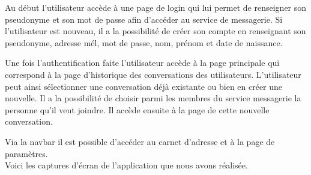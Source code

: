 \par Au début l'utilisateur accède à une page de login qui lui permet de renseigner son pseudonyme et son mot de passe afin d'accéder au service de messagerie. Si l'utilisateur est nouveau, il a la possibilité de créer son compte en renseignant son pseudonyme, adresse mél, mot de passe, nom, prénom et date de naissance. 
\par Une fois l'authentification faite l'utilisateur accède à la page principale qui correspond à la page d'historique des conversations des utilisateurs. L'utilisateur peut ainsi sélectionner une conversation déjà existante ou bien en créer une nouvelle. Il a la possibilité de choisir parmi les membres du service messagerie la personne qu'il veut joindre. Il accède ensuite à la page de cette nouvelle conversation.
\par Via la navbar il est possible d'accéder au carnet d'adresse et à la page de paramètres. \\

Voici les captures d'écran de l'application que nous avons réalisée.



